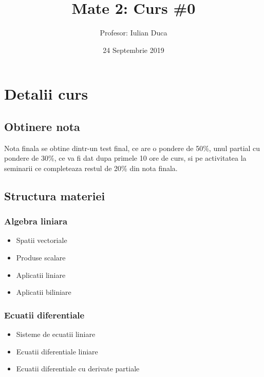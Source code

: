 \documentclass{article}
\title{Mate 2: Curs \#0}
\author{Profesor: Iulian Duca}
\date{24 Septembrie 2019}
\begin{document}
\maketitle

\section{Detalii curs}
    \subsection{Obtinere nota}
        Nota finala se obtine dintr-un test final, ce are o pondere de 50\%, unul partial cu pondere de 30\%, ce va fi dat dupa primele 10 ore de curs, si pe activitatea la seminarii ce completeaza restul de 20\% din nota finala.
    \subsection{Structura materiei}
        \subsubsection{Algebra liniara}
            \begin{itemize}
                \item Spatii vectoriale
                \item Produse scalare 
                \item Aplicatii liniare 
                \item Aplicatii biliniare
            \end{itemize}
        \subsubsection{Ecuatii diferentiale}
            \begin{itemize}
                \item Sisteme de ecuatii liniare 
                \item Ecuatii diferentiale liniare 
                \item Ecuatii diferentiale cu derivate partiale 
            \end{itemize}
\newpage
\end{document}
